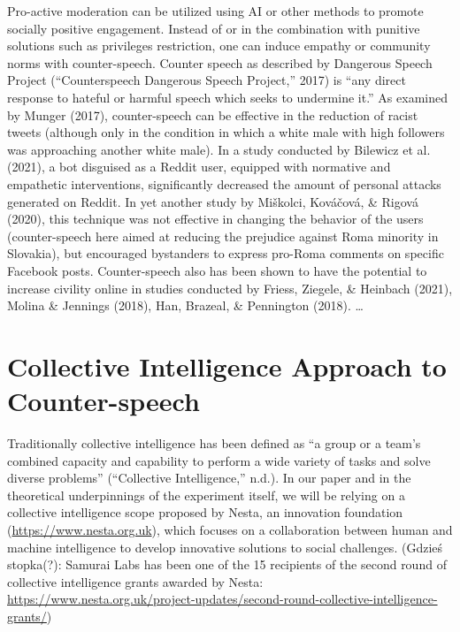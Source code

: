 \documentclass[
  10pt,
  dvipsnames,enabledeprecatedfontcommands]{scrartcl}
\begin{document}
Pro-active moderation can be utilized using AI or other methods to
promote socially positive engagement. Instead of or in the combination
with punitive solutions such as privileges restriction, one can induce
empathy or community norms with counter-speech. Counter speech as
described by Dangerous Speech Project ({``Counterspeech {{}} {Dangerous}
{Speech} {Project},''} 2017) is ``any direct response to hateful or
harmful speech which seeks to undermine it.'' As examined by Munger
(2017), counter-speech can be effective in the reduction of racist
tweets (although only in the condition in which a white male with high
followers was approaching another white male). In a study conducted by
Bilewicz et al. (2021), a bot disguised as a Reddit user, equipped with
normative and empathetic interventions, significantly decreased the
amount of personal attacks generated on Reddit. In yet another study by
Miškolci, Kováčová, \& Rigová (2020), this technique was not effective
in changing the behavior of the users (counter-speech here aimed at
reducing the prejudice against Roma minority in Slovakia), but
encouraged bystanders to express pro-Roma comments on specific Facebook
posts. Counter-speech also has been shown to have the potential to
increase civility online in studies conducted by Friess, Ziegele, \&
Heinbach (2021), Molina \& Jennings (2018), Han, Brazeal, \& Pennington
(2018). \ldots{}

\hypertarget{collective-intelligence-approach-to-counter-speech}{%
\section{Collective Intelligence Approach to
Counter-speech}\label{collective-intelligence-approach-to-counter-speech}}

Traditionally collective intelligence has been defined as ``a group or a
team's combined capacity and capability to perform a wide variety of
tasks and solve diverse problems'' ({``Collective {Intelligence},''}
n.d.). In our paper and in the theoretical underpinnings of the
experiment itself, we will be relying on a collective intelligence scope
proposed by Nesta, an innovation foundation
(\url{https://www.nesta.org.uk}), which focuses on a collaboration
between human and machine intelligence to develop innovative solutions
to social challenges. (Gdzieś stopka(?): Samurai Labs has been one of
the 15 recipients of the second round of collective intelligence grants
awarded by Nesta:
\url{https://www.nesta.org.uk/project-updates/second-round-collective-intelligence-grants/})
\end{document}
